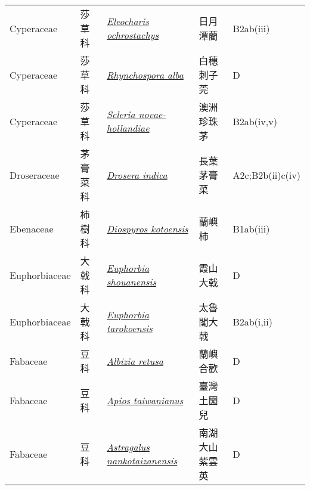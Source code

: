 {\begin{longtable}{p{2.5cm}p{2.5cm}p{4.5cm}p{2.5cm}p{3cm}}
    Cyperaceae & 莎草科 & \href{http://www.theplantlist.org/tpl1.1/search?q=Eleocharis+ochrostachys}{\textit{Eleocharis ochrostachys} } & 日月潭藺 & B2ab(iii) \index{Eleocharis@\textit{Eleocharis}!ochrostachys@\textit{ochrostachys}}  \index{日月潭藺} \\
    Cyperaceae & 莎草科 & \href{http://www.theplantlist.org/tpl1.1/search?q=Rhynchospora+alba}{\textit{Rhynchospora alba} } & 白穗刺子莞 & D \index{Rhynchospora@\textit{Rhynchospora}!alba@\textit{alba}}  \index{白穗刺子莞} \\
    Cyperaceae & 莎草科 & \href{http://www.theplantlist.org/tpl1.1/search?q=Scleria+novae-hollandiae}{\textit{Scleria novae-hollandiae} } & 澳洲珍珠茅 & B2ab(iv,v) \index{Scleria@\textit{Scleria}!novae-hollandiae@\textit{novae-hollandiae}}  \index{澳洲珍珠茅} \\
    Droseraceae & 茅膏菜科 & \href{http://www.theplantlist.org/tpl1.1/search?q=Drosera+indica}{\textit{Drosera indica} } & 長葉茅膏菜 & A2c;B2b(ii)c(iv) \index{Drosera@\textit{Drosera}!indica@\textit{indica}}  \index{長葉茅膏菜} \\
    Ebenaceae & 柿樹科 & \href{http://www.theplantlist.org/tpl1.1/search?q=Diospyros+kotoensis}{\textit{Diospyros kotoensis} } & 蘭嶼柿 & B1ab(iii) \index{Diospyros@\textit{Diospyros}!kotoensis@\textit{kotoensis}}  \index{蘭嶼柿} \\
    Euphorbiaceae & 大戟科 & \href{http://www.theplantlist.org/tpl1.1/search?q=Euphorbia+shouanensis}{\textit{Euphorbia shouanensis} } & 霞山大戟 & D \index{Euphorbia@\textit{Euphorbia}!shouanensis@\textit{shouanensis}}  \index{霞山大戟} \\
    Euphorbiaceae & 大戟科 & \href{http://www.theplantlist.org/tpl1.1/search?q=Euphorbia+tarokoensis}{\textit{Euphorbia tarokoensis} } & 太魯閣大戟 & B2ab(i,ii) \index{Euphorbia@\textit{Euphorbia}!tarokoensis@\textit{tarokoensis}}  \index{太魯閣大戟} \\
    Fabaceae & 豆科 & \href{http://www.theplantlist.org/tpl1.1/search?q=Albizia+retusa}{\textit{Albizia retusa} } & 蘭嶼合歡 & D \index{Albizia@\textit{Albizia}!retusa@\textit{retusa}}  \index{蘭嶼合歡} \\
    Fabaceae & 豆科 & \href{http://www.theplantlist.org/tpl1.1/search?q=Apios+taiwanianus}{\textit{Apios taiwanianus} } & 臺灣土圞兒 & D \index{Apios@\textit{Apios}!taiwanianus@\textit{taiwanianus}}  \index{臺灣土圞兒} \\
    Fabaceae & 豆科 & \href{http://www.theplantlist.org/tpl1.1/search?q=Astragalus+nankotaizanensis}{\textit{Astragalus nankotaizanensis} } & 南湖大山紫雲英 & D \index{Astragalus@\textit{Astragalus}!nankotaizanensis@\textit{nankotaizanensis}}  \index{南湖大山紫雲英} \\

\end{longtable}}
